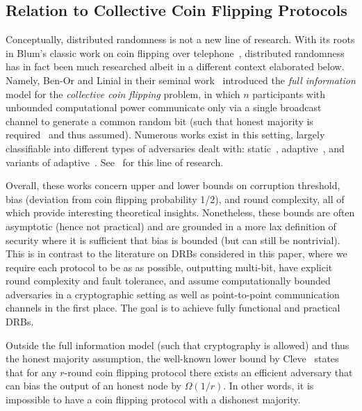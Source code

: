 \subsection{Relation to Collective Coin Flipping Protocols}
Conceptually, distributed randomness is not a new line of research.
With its roots in Blum's classic work on coin flipping over telephone~\cite{blum1983coin}, distributed randomness has in fact been much researched albeit in a different context elaborated below.
Namely, Ben-Or and Linial in their seminal work~\cite{ben1985collective,ben1989collective} introduced the \textit{full information} model for the \textit{collective coin flipping} problem, in which $n$ participants with unbounded computational power communicate only via a single broadcast channel to generate a common random bit (such that honest majority is required~\cite{saks1989robust,boppana2000perfect} and thus assumed).
Numerous works exist in this setting, largely classifiable into different types of adversaries dealt with: static~\cite{ben1989collective,ajtai1993influence,kahn1989influence,saks1989robust,alon1993coin,boppana2000perfect,feige1999noncryptographic,russell1999lower}, adaptive~\cite{ben1989collective,lichtenstein1989some,goldwasser2015adaptively,dodis2000impossibility,kalai2021lower,haitner2020tight}, and variants of adaptive~\cite{mahloujifar2019can,etesami2020computational,cleve1993martingales,aspnes1998lower,goldwasser2015adaptively}.
See~\cite{kalai2021lower,haitner2020tight} for this line of research.

Overall, these works concern upper and lower bounds on corruption threshold, bias (deviation from coin flipping probability 1/2), and round complexity, all of which provide interesting theoretical insights.
Nonetheless, these bounds are often asymptotic (hence not practical) and are grounded in a more lax definition of security where it is sufficient that bias is bounded (but can still be nontrivial).
This is in contrast to the literature on DRBs considered in this paper, where we require each protocol to be as \drbsecure as possible, outputting multi-bit, have explicit round complexity and fault tolerance, and assume computationally bounded adversaries in a cryptographic setting as well as point-to-point communication channels in the first place.
The goal is to achieve fully functional and practical DRBs.

Outside the full information model (such that cryptography is allowed) and thus the honest majority assumption, the well-known lower bound by Cleve~\cite{cleve1986limits} states that for any $r$-round coin flipping protocol there exists an efficient adversary that can bias the output of an honest node by $\Omega(1 / r)$.
In other words, it is impossible to have a \drbsecure coin flipping protocol with a dishonest majority.

